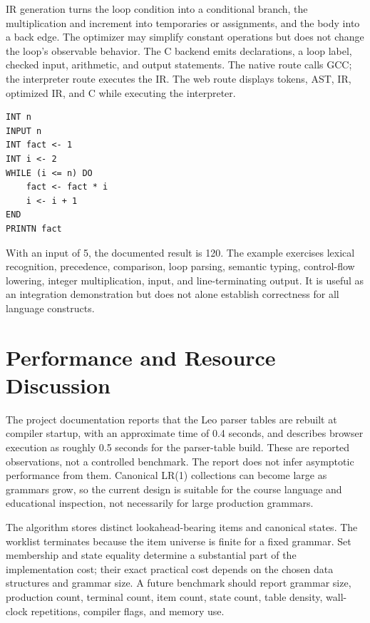\documentclass[12pt,a4paper,oneside]{report}
\begin{document}
IR generation turns the loop condition into a conditional branch, the multiplication and increment into temporaries or assignments, and the body into a back edge. The optimizer may simplify constant operations but does not change the loop's observable behavior. The C backend emits declarations, a loop label, checked input, arithmetic, and output statements. The native route calls GCC; the interpreter route executes the IR. The web route displays tokens, AST, IR, optimized IR, and C while executing the interpreter.

\begin{lstlisting}[caption={Leo Factorial Program Used as a Pipeline Example},label={lst:factorial}]
INT n
INPUT n
INT fact <- 1
INT i <- 2
WHILE (i <= n) DO
    fact <- fact * i
    i <- i + 1
END
PRINTN fact
\end{lstlisting}

With an input of 5, the documented result is 120. The example exercises lexical recognition, precedence, comparison, loop parsing, semantic typing, control-flow lowering, integer multiplication, input, and line-terminating output. It is useful as an integration demonstration but does not alone establish correctness for all language constructs.

\section{Performance and Resource Discussion}
The project documentation reports that the Leo parser tables are rebuilt at compiler startup, with an approximate time of 0.4 seconds, and describes browser execution as roughly 0.5 seconds for the parser-table build. These are reported observations, not a controlled benchmark. The report does not infer asymptotic performance from them. Canonical LR(1) collections can become large as grammars grow, so the current design is suitable for the course language and educational inspection, not necessarily for large production grammars.

The algorithm stores distinct lookahead-bearing items and canonical states. The worklist terminates because the item universe is finite for a fixed grammar. Set membership and state equality determine a substantial part of the implementation cost; their exact practical cost depends on the chosen data structures and grammar size. A future benchmark should report grammar size, production count, terminal count, item count, state count, table density, wall-clock repetitions, compiler flags, and memory use.
\end{document}
